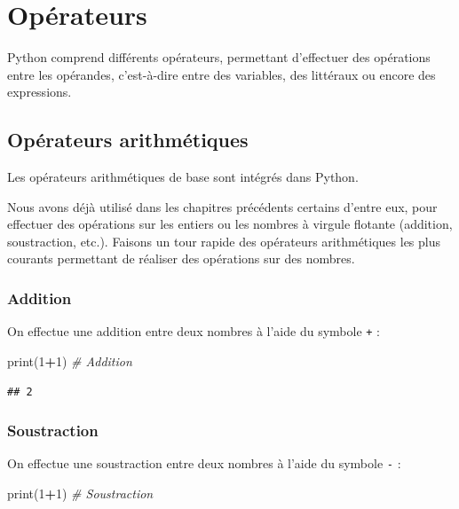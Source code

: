 \documentclass[12pt,]{book}
\newenvironment{Shaded}{\begin{snugshade}}{\end{snugshade}}
\newcommand{\DecValTok}[1]{\textcolor[rgb]{0.00,0.00,0.81}{#1}}
\newcommand{\CommentTok}[1]{\textcolor[rgb]{0.56,0.35,0.01}{\textit{#1}}}
\newcommand{\OperatorTok}[1]{\textcolor[rgb]{0.81,0.36,0.00}{\textbf{#1}}}
\newcommand{\BuiltInTok}[1]{#1}
\newcommand{\NormalTok}[1]{#1}
\numberwithin{equation}{section}
\numberwithin{countremarque}{section}
\begin{document}
\chapter{Opérateurs}\label{operateurs}

Python comprend différents opérateurs, permettant d'effectuer des
opérations entre les opérandes, c'est-à-dire entre des variables, des
littéraux ou encore des expressions.

\section{Opérateurs arithmétiques}\label{operateurs-arithmetiques}

Les opérateurs arithmétiques de base sont intégrés dans Python.

Nous avons déjà utilisé dans les chapitres précédents certains d'entre
eux, pour effectuer des opérations sur les entiers ou les nombres à
virgule flotante (addition, soustraction, etc.). Faisons un tour rapide
des opérateurs arithmétiques les plus courants permettant de réaliser
des opérations sur des nombres.

\subsection{Addition}\label{addition}

On effectue une addition entre deux nombres à l'aide du symbole
\texttt{+} :

\begin{Shaded}
\begin{Highlighting}[]
\BuiltInTok{print}\NormalTok{(}\DecValTok{1}\OperatorTok{+}\DecValTok{1}\NormalTok{) }\CommentTok{# Addition}
\end{Highlighting}
\end{Shaded}

\begin{lstlisting}
## 2
\end{lstlisting}

\subsection{Soustraction}\label{soustraction}

On effectue une soustraction entre deux nombres à l'aide du symbole
\texttt{-} :

\begin{Shaded}
\begin{Highlighting}[]
\BuiltInTok{print}\NormalTok{(}\DecValTok{1}\OperatorTok{+}\DecValTok{1}\NormalTok{) }\CommentTok{# Soustraction}
\end{Highlighting}
\end{Shaded}
\end{document}
